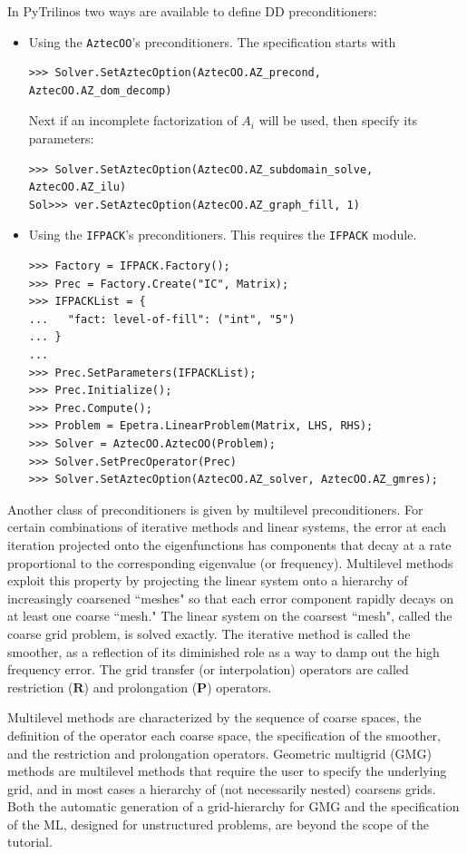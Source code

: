 \documentclass[10pt,relax]{SANDreport}
\begin{document}
In PyTrilinos two ways are available to define DD preconditioners:
\begin{itemize}
\item Using the {\tt AztecOO}'s preconditioners. The specification starts with
\begin{verbatim}
>>> Solver.SetAztecOption(AztecOO.AZ_precond, AztecOO.AZ_dom_decomp)
\end{verbatim}
Next if an incomplete factorization of $A_i$ will be used, then specify its parameters:
\begin{verbatim}
>>> Solver.SetAztecOption(AztecOO.AZ_subdomain_solve, AztecOO.AZ_ilu)
Sol>>> ver.SetAztecOption(AztecOO.AZ_graph_fill, 1)
\end{verbatim}

\item Using the {\tt IFPACK}'s preconditioners. This requires the {\tt IFPACK}
module.
\begin{verbatim}
>>> Factory = IFPACK.Factory();
>>> Prec = Factory.Create("IC", Matrix);
>>> IFPACKList = {
...   "fact: level-of-fill": ("int", "5")
... }
... 
>>> Prec.SetParameters(IFPACKList);
>>> Prec.Initialize();
>>> Prec.Compute();
>>> Problem = Epetra.LinearProblem(Matrix, LHS, RHS);
>>> Solver = AztecOO.AztecOO(Problem);
>>> Solver.SetPrecOperator(Prec)
>>> Solver.SetAztecOption(AztecOO.AZ_solver, AztecOO.AZ_gmres);
\end{verbatim}
\end{itemize}

\bigskip

Another class of preconditioners is given by multilevel preconditioners.
For certain combinations of iterative methods and linear systems, the
error at each iteration projected onto the eigenfunctions has components
that decay at a rate proportional to the corresponding eigenvalue (or
frequency).  Multilevel methods exploit this property \cite{Briggs2000}
by projecting the linear system onto a hierarchy of increasingly
coarsened ``meshes" so that each error component rapidly decays on at
least one coarse ``mesh."  The linear system on the coarsest ``mesh",
called the coarse grid problem, is solved exactly.  The iterative method
is called the smoother, as a reflection of its diminished role as a way
to damp out the high frequency error.  The grid transfer (or
interpolation) operators are called restriction ($\mathbf{R}$) and
prolongation ($\mathbf{P}$) operators.

Multilevel methods are characterized by the sequence of coarse spaces, the
definition of the operator each coarse space, the specification of the
smoother, and the restriction and prolongation operators.  Geometric multigrid
(GMG) methods  are multilevel methods that require the user to specify the
underlying grid, and in most cases a hierarchy of (not necessarily nested)
  coarsens grids.  Both the automatic generation of a grid-hierarchy for GMG
  and the specification of the ML, designed for unstructured problems, are
  beyond the scope of the tutorial.
\end{document}
